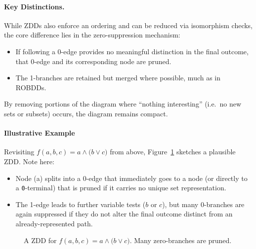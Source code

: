 \paragraph{Key Distinctions.}
While ZDDs also enforce an ordering and can be reduced via isomorphism checks, the core difference lies in the zero-suppression mechanism:
\begin{itemize}
\item If following a 0-edge provides no meaningful distinction in the final outcome, that 0-edge and its corresponding node are pruned.
\item The 1-branches are retained but merged where possible, much as in ROBDDs.
\end{itemize}
By removing portions of the diagram where “nothing interesting” (i.e.\ no new sets or subsets) occurs, the diagram remains compact.

\paragraph{Illustrative Example}
Revisiting $f(a,b,c)=a \land \bigl(b \lor c\bigr)$ from above, Figure~\ref{fig:zdd} sketches a plausible ZDD. Note here:
\begin{itemize}
\item Node (a) splits into a 0-edge that immediately goes to a node (or directly to a \texttt{0}-terminal) that is pruned if it carries no unique set representation.
\item The 1-edge leads to further variable tests ($b$ or $c$), but many 0-branches are again suppressed if they do not alter the final outcome distinct from an already-represented path.
\end{itemize}

\begin{figure}[htbp]
\centering
{}
\caption{A ZDD for $f(a,b,c)=a \land \bigl(b \lor c\bigr)$. Many zero-branches are pruned.}
\label{fig:zdd}
\end{figure}

